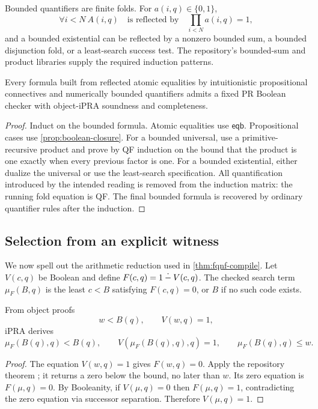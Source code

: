 Bounded quantifiers are finite folds.  For \(a(i,q)\in\{0,1\}\),
\[
  \forall i<N\ A(i,q)
  \quad\text{is reflected by}\quad
  \prod_{i<N}a(i,q)=1,
\]
and a bounded existential can be reflected by a nonzero bounded sum, a
bounded disjunction fold, or a least-search success test.  The repository's
bounded-sum and product libraries supply the required induction patterns.

\begin{theorem}\label{thm:bounded-compile}
Every formula built from reflected atomic equalities by intuitionistic
propositional connectives and numerically bounded quantifiers admits a fixed PR
Boolean checker with object-iPRA soundness and completeness.
\end{theorem}

\begin{proof}
Induct on the bounded formula.  Atomic equalities use \(\mathsf{eqb}\).
Propositional cases use \cref{prop:boolean-closure}.  For a bounded universal,
use a primitive-recursive product and prove by QF induction on the bound that
the product is one exactly when every previous factor is one.  For a bounded
existential, either dualize the universal or use the least-search specification.
All quantification introduced by the intended reading is removed from the
induction matrix: the running fold equation is QF.  The final bounded formula
is recovered by ordinary quantifier rules after the induction.
\end{proof}

\subsection{Selection from an explicit witness}

We now spell out the arithmetic reduction used in
\cref{thm:fqnf-compile}.  Let \(V(c,q)\) be Boolean and define
\(F(c,q)=1\mathbin{\dot{-}} V(c,q)\).  The checked search term
\(\mu_F(B,q)\) is the least \(c<B\) satisfying \(F(c,q)=0\), or \(B\) if no
such code exists.

\begin{theorem}\label{thm:least-cert}
From object proofs
\[
 w<B(q),\qquad V(w,q)=1,
\]
iPRA derives
\[
 \mu_F(B(q),q)<B(q),
 \qquad V(\mu_F(B(q),q),q)=1,
 \qquad \mu_F(B(q),q)\le w.
\]
\end{theorem}

\begin{proof}
The equation \(V(w,q)=1\) gives \(F(w,q)=0\).  Apply the repository theorem
; it returns a zero below the bound, no later
than \(w\).  Its zero equation is \(F(\mu,q)=0\).  By Booleanity, if
\(V(\mu,q)=0\) then \(F(\mu,q)=1\), contradicting the zero equation via
successor separation.  Therefore \(V(\mu,q)=1\).
\end{proof}

